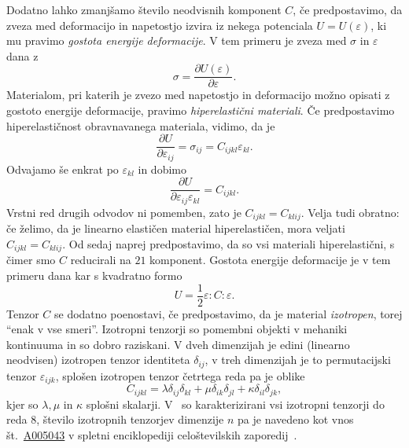 \documentclass[12pt,a4paper,twoside]{article}
\theoremstyle{definition} %
\theoremstyle{plain} %
\numberwithin{equation}{section}
\newcommand{\eps}{\varepsilon}
\newcommand{\dpar}[2]{\ensuremath{\frac{\partial #1}{\partial #2}}}
\newcommand{\ts}{\sigma}
\begin{document}
Dodatno lahko zmanjšamo število neodvisnih komponent $C$, če predpostavimo, da zveza med deformacijo
in napetostjo izvira iz nekega potenciala $U = U(\eps)$, ki mu pravimo \emph{gostota energije
deformacije}. V tem primeru je zveza med $\ts$ in $\eps$ dana z
\begin{equation}
   \ts = \dpar{U(\eps)}{\eps}.
\end{equation}
Materialom, pri katerih je zvezo med napetostjo in deformacijo možno opisati z gostoto energije
deformacije, pravimo \emph{hiperelastični materiali}.
Če predpostavimo hiperelastičnost obravnavanega materiala, vidimo, da je
\begin{equation}
  \dpar{U}{\eps_{ij}} = \sigma_{ij} = C_{ijkl}\eps_{kl}.
\end{equation}
Odvajamo še enkrat po $\eps_{kl}$ in dobimo
\begin{equation}
  \dpar{U}{\eps_{ij}\eps_{kl}} = C_{ijkl}.
\end{equation}
Vrstni red drugih odvodov ni pomemben, zato je $C_{ijkl} = C_{klij}$. Velja tudi obratno: če želimo,
da je linearno elastičen material hiperelastičen, mora veljati $C_{ijkl} = C_{klij}$.
Od sedaj naprej predpostavimo, da so vsi materiali hiperelastični, s čimer smo $C$ reducirali
na $21$ komponent. Gostota energije deformacije je v tem primeru dana kar s kvadratno formo
\begin{equation}
  U = \frac12 \eps:C:\eps.
  \label{eq:energy}
\end{equation}
Tenzor $C$ se dodatno poenostavi, če predpostavimo, da je material \emph{izotropen}, torej ``enak
v vse smeri''. Izotropni tenzorji so pomembni objekti v mehaniki kontinuuma in so dobro
raziskani. V dveh dimenzijah je edini (linearno neodvisen) izotropen tenzor identiteta
$\delta_{ij}$, v treh dimenzijah je to permutacijski tenzor $\eps_{ijk}$, splošen izotropen tenzor
četrtega reda pa je oblike
\begin{equation}
  \label{eq:isotropic}
   C_{ijkl} = \lambda \delta_{ij}\delta_{kl} + \mu \delta_{ik}\delta_{jl} +
   \kappa\delta_{il}\delta_{jk},
\end{equation}
kjer so $\lambda, \mu$ in $\kappa$ splošni skalarji. V~\cite{kearsley1975linearly} so
karakterizirani vsi izotropni tenzorji do reda 8, število izotropnih tenzorjev
dimenzije $n$ pa je navedeno kot vnos št.~\href{http://oeis.org/A005043}{A005043} v spletni enciklopediji
celoštevilskih zaporedij~\cite{oeis}.
\end{document}
